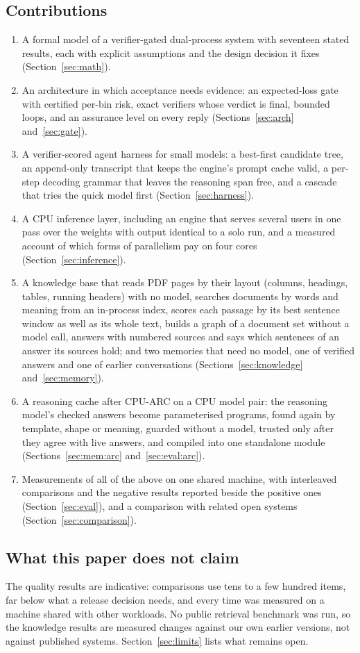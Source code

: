 \subsection{Contributions}
\begin{enumerate}
\item A formal model of a verifier-gated dual-process system with seventeen
stated results, each with explicit assumptions and the design decision it
fixes (Section~\ref{sec:math}).
\item An architecture in which acceptance needs evidence: an expected-loss gate
with certified per-bin risk, exact verifiers whose verdict is final, bounded
loops, and an assurance level on every reply
(Sections~\ref{sec:arch} and~\ref{sec:gate}).
\item A verifier-scored agent harness for small models: a best-first candidate
tree, an append-only transcript that keeps the engine's prompt cache valid, a
per-step decoding grammar that leaves the reasoning span free, and a cascade
that tries the quick model first (Section~\ref{sec:harness}).
\item A CPU inference layer, including an engine that serves several users in
one pass over the weights with output identical to a solo run, and a measured
account of which forms of parallelism pay on four cores
(Section~\ref{sec:inference}).
\item A knowledge base that reads PDF pages by their layout (columns,
headings, tables, running headers) with no model, searches documents by words
and meaning from an in-process index, scores each passage by its best
sentence window as well as its whole text, builds a graph of a document set without a model call,
answers with numbered sources and says which sentences of an answer its
sources hold; and two memories that need no model, one of verified answers
and one of earlier conversations (Sections~\ref{sec:knowledge}
and~\ref{sec:memory}).
\item A reasoning cache after CPU-ARC on a CPU model pair: the reasoning
model's checked answers become parameterised programs, found again by
template, shape or meaning, guarded without a model, trusted only after they
agree with live answers, and compiled into one standalone module
(Sections~\ref{sec:mem:arc} and~\ref{sec:eval:arc}).
\item Measurements of all of the above on one shared machine, with interleaved
comparisons and the negative results reported beside the positive ones
(Section~\ref{sec:eval}), and a comparison with related open systems
(Section~\ref{sec:comparison}).
\end{enumerate}

\subsection{What this paper does not claim}
The quality results are indicative: comparisons use tens to a few hundred
items, far below what a release decision needs, and every time was measured on
a machine shared with other workloads. No public retrieval benchmark was run,
so the knowledge results are measured changes against our own earlier versions,
not against published systems. Section~\ref{sec:limits} lists what remains open.
